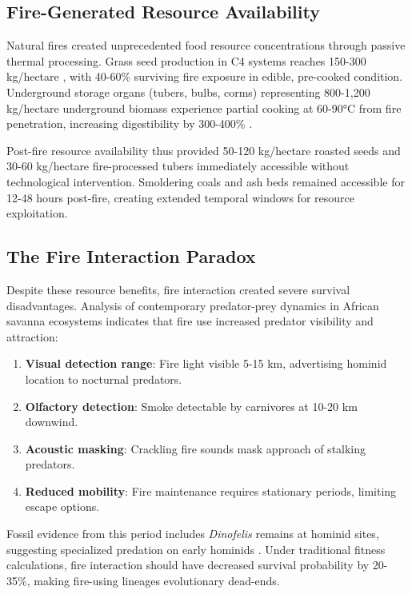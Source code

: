 \documentclass[12pt,a4paper]{article}
\begin{document}
\subsection{Fire-Generated Resource Availability}

Natural fires created unprecedented food resource concentrations through passive thermal processing. Grass seed production in C4 systems reaches 150-300 kg/hectare \citep{westoby2002plant}, with 40-60\% surviving fire exposure in edible, pre-cooked condition. Underground storage organs (tubers, bulbs, corms) representing 800-1,200 kg/hectare underground biomass experience partial cooking at 60-90°C from fire penetration, increasing digestibility by 300-400\% \citep{carmody2009energetic,wrangham2009catching}.

Post-fire resource availability thus provided 50-120 kg/hectare roasted seeds and 30-60 kg/hectare fire-processed tubers immediately accessible without technological intervention. Smoldering coals and ash beds remained accessible for 12-48 hours post-fire, creating extended temporal windows for resource exploitation.

\subsection{The Fire Interaction Paradox}

Despite these resource benefits, fire interaction created severe survival disadvantages. Analysis of contemporary predator-prey dynamics in African savanna ecosystems indicates that fire use increased predator visibility and attraction:

\begin{enumerate}
\item \textbf{Visual detection range}: Fire light visible 5-15 km, advertising hominid location to nocturnal predators.
\item \textbf{Olfactory detection}: Smoke detectable by carnivores at 10-20 km downwind.
\item \textbf{Acoustic masking}: Crackling fire sounds mask approach of stalking predators.
\item \textbf{Reduced mobility}: Fire maintenance requires stationary periods, limiting escape options.
\end{enumerate}

Fossil evidence from this period includes \textit{Dinofelis} remains at hominid sites, suggesting specialized predation on early hominids \citep{lewis2006carnivore}. Under traditional fitness calculations, fire interaction should have decreased survival probability by 20-35\%, making fire-using lineages evolutionary dead-ends.
\end{document}
